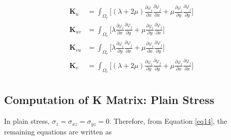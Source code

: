 \documentclass[12pt]{article}
\begin{document}
\begin{equation}		\label{eq50a}
\begin{split}
\mathbf{K}_{u}&=\int_{\Omega_e}\Bigg[(\lambda+2\mu)\frac{\partial \varphi_i}{\partial x}\frac{\partial \varphi_j}{\partial x}+\mu\frac{\partial \varphi_i}{\partial y}\frac{\partial \varphi_j}{\partial y} \Bigg]	\\
%
\mathbf{K}_{{uv}}&=\int_{\Omega_e}\Bigg[\lambda\frac{\partial \varphi_i}{\partial x}\frac{\partial \varphi_j}{\partial y} + \mu\frac{\partial \varphi_i}{\partial y}\frac{\partial \varphi_j}{\partial x}\Bigg]	\\
%
%
\mathbf{K}_{{vu}}&= \int_{\Omega_e}\Bigg[\lambda\frac{\partial \varphi_i}{\partial y}\frac{\partial \varphi_j}{\partial x}+\mu\frac{\partial \varphi_i}{\partial x}\frac{\partial \varphi_j}{\partial y}\Bigg] 		\\
%
\mathbf{K}_{{v}}&=\int_{\Omega_e}\Bigg[(\lambda+2\mu)\frac{\partial \varphi_i}{\partial y}\frac{\partial \varphi_j}{\partial y}+\mu\frac{\partial \varphi_i}{\partial x}\frac{\partial \varphi_j}{\partial x} \Bigg]		\\
\end{split}
\end{equation}


\subsection{Computation of K Matrix: Plain Stress}
In plain stress, $\sigma_z = \sigma_{xz}= \sigma_{yz} = 0$. Therefore, from Equation \ref{eq14}, the remaining equations are written as
\end{document}
